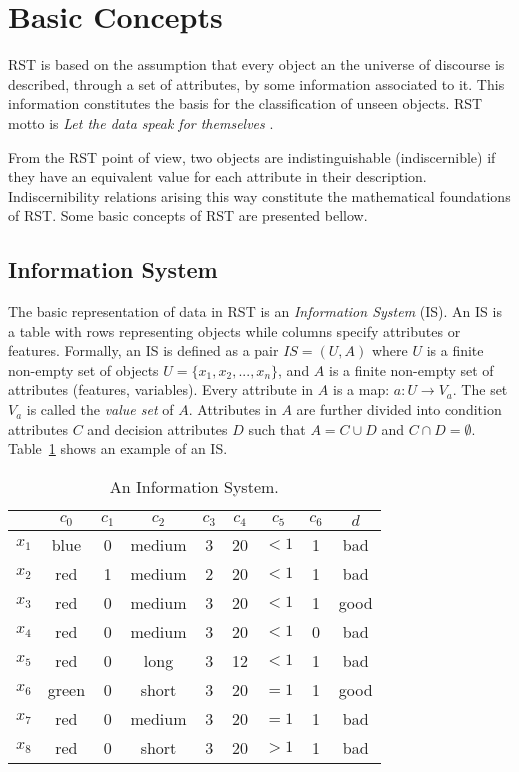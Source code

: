 \documentclass[authoryear,preprint,review,12pt]{elsarticle}
\begin{document}
\section{Basic Concepts}\label{basicConcepts}
  RST is based on the assumption that every object an the universe of discourse is described, through a 
  set of attributes, by some information associated to it. This information constitutes the basis for the
  classification of unseen objects. RST motto is \textit{Let the data speak for themselves} \citep{Tiwari14}.

  From the RST point of view, two objects are indistinguishable (indiscernible) if they have an equivalent 
  value for each attribute in their description. Indiscernibility relations arising this way constitute the
  mathematical foundations of RST. 
  Some basic concepts of RST are presented bellow.
  
\subsection{Information System}
  The basic representation of data in RST is an \emph{Information System} (IS). An IS is a table with rows
  representing objects while columns specify attributes or features. Formally, an IS is defined as a pair
  $IS=(U,A)$ where $U$ is a finite non-empty set of objects $U=\lbrace x_1,x_2,...,x_n\rbrace$, and $A$ is a 
  finite non-empty set
  of attributes (features, variables). Every attribute in $A$ is a map: $a: U \rightarrow V_a$. The set $V_a$ is
  called the \textit{value set} of $A$. Attributes in $A$ are further divided into condition attributes $C$ and 
  decision attributes $D$ such that $A=C \cup D$ and $C \cap D =\emptyset$. 
  Table~\ref{tab_IS} shows an example of an IS.
  
 \begin{table}[htb]
		\caption{An Information System.} \label{tab_IS}
		\centering
 	\begin{tabular}{c||c|c|c|c|c|c|c||c}
 			  & $c_0$ & $c_1$ & $c_2$ &  $c_3$ & $c_4$ & $c_5$ &  $c_6$ & $d$ \\
 		\hline \hline
		$x_1$ &   blue  & 0 & medium & 3 & 20 & $<1$  & 1 & bad   \\
		$x_2$ &   red   & 1 & medium & 2 & 20 & $<1$  & 1 & bad   \\
		$x_3$ &   red   & 0 & medium & 3 & 20 & $<1$  & 1 & good   \\
		$x_4$ &   red   & 0 & medium & 3 & 20 & $<1$  & 0 & bad   \\
		$x_5$ &   red   & 0 & long   & 3 & 12 & $<1$  & 1 & bad   \\
		$x_6$ &   green & 0 & short  & 3 & 20 & $=1$  & 1 & good   \\
		$x_7$ &   red   & 0 & medium & 3 & 20 & $=1$  & 1 & bad   \\
		$x_8$ &   red   & 0 & short  & 3 & 20 & $>1$  & 1 & bad   \\
 	\end{tabular}             
 \end{table}
 
\end{document}
